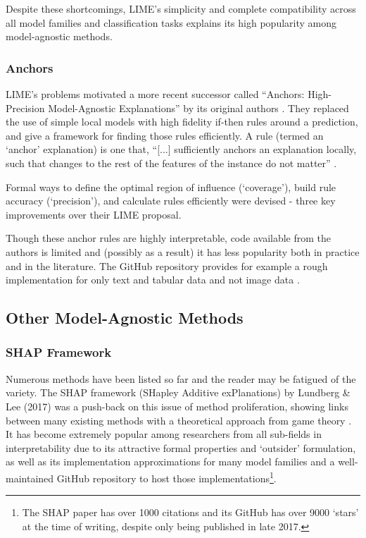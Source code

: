 \documentclass[main]{subfiles}
\begin{document}
Despite these shortcomings, LIME's simplicity and complete compatibility across all model families and classification tasks explains its high popularity among model-agnostic methods.

\subsubsection{Anchors}

LIME's problems motivated a more recent successor called ``Anchors: High-Precision Model-Agnostic Explanations'' by its original authors \cite{anchors}. They replaced the use of simple local models with high fidelity if-then rules around a prediction, and give a framework for finding those rules efficiently. A rule (termed an `anchor' explanation) is one that, ``[...] sufficiently anchors an explanation locally, such that changes to the rest of the features of the instance do not matter'' \cite{anchors}. 

Formal ways to define the optimal region of influence (`coverage'), build rule accuracy (`precision'), and calculate rules efficiently were devised - three key improvements over their LIME proposal.

Though these anchor rules are highly interpretable, code available from the authors is limited and (possibly as a result) it has less popularity both in practice and in the literature. The GitHub repository provides for example a rough implementation for only text and tabular data and not image data \cite{anchorsrepo}.

\subsection{Other Model-Agnostic Methods}

\subsubsection{SHAP Framework}

Numerous methods have been listed so far and the reader may be fatigued of the variety. The SHAP framework (SHapley Additive exPlanations) by Lundberg \& Lee (2017) was a push-back on this issue of method proliferation, showing links between many existing methods with a theoretical approach from game theory \cite{shap}. It has become extremely popular among researchers from all sub-fields in interpretability due to its attractive formal properties and `outsider' formulation, as well as its implementation approximations for many model families and a well-maintained GitHub repository to host those implementations\footnote{The SHAP paper has over 1000 citations and its GitHub has over 9000 `stars' \cite{shaprepo} at the time of writing, despite only being published in late 2017.}. 
 
\end{document}
